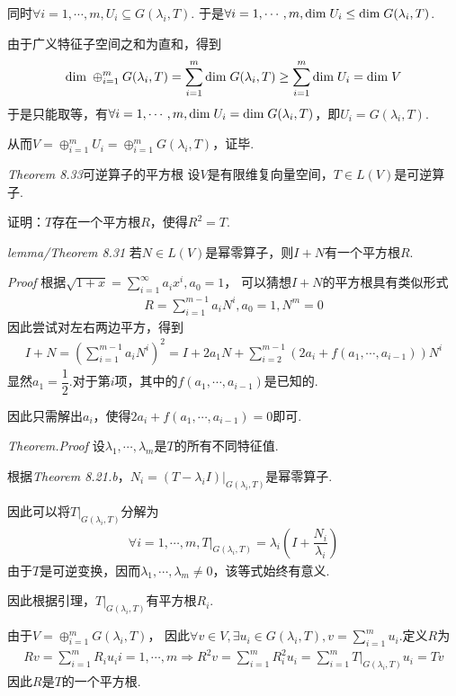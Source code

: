 同时\(\forall i=1,\cdots,m,U_i \subseteq G(\lambda_i,T)\).
于是\(\forall i=1,\cdots,m,\mathrm{dim \;} U_i \leq \mathrm{dim \;} G(\lambda_i,T)\).

由于广义特征子空间之和为直和，得到
    \begin{align*}
        \mathrm{dim \;} \oplus_{i=1}^m G(\lambda_i,T)=\sum_{i=1}^m \mathrm{dim \;} G(\lambda_i,T) \geq \sum_{i=1}^m \mathrm{dim \;} U_i=\mathrm{dim \;} V
    \end{align*}
于是只能取等，有\(\forall i=1,\cdots,m,\mathrm{dim \;} U_i=\mathrm{dim \;} G(\lambda_i,T)\)，即\(U_i=G(\lambda_i,T)\).

从而\(V=\oplus_{i=1}^m U_i=\oplus_{i=1}^m G(\lambda_i,T)\)，证毕.

\newpage

\textit{Theorem 8.33}{\kaishu 可逆算子的平方根}
设\(V\)是有限维复向量空间，\(T \in L(V)\)是可逆算子.

证明：\(T\)存在一个平方根\(R\)，使得\(R^2=T\).

\textit{lemma/Theorem 8.31}
若\(N \in L(V)\)是幂零算子，则\(I+N\)有一个平方根\(R\).

\textit{Proof}
根据\(\sqrt{1+x}=\sum_{i=1}^\infty a_ix^i,a_0=1\)，
可以猜想\(I+N\)的平方根具有类似形式
    \begin{align*}
        R=\sum_{i=1}^{m-1} a_iN^i,a_0=1,N^m=0
    \end{align*}
因此尝试对左右两边平方，得到
    \begin{align*}
        I+N = (\sum_{i=1}^{m-1} a_iN^i)^2 
            = I+2a_1N+\sum_{i=2}^{m-1} (2a_i+f(a_1,\cdots,a_{i-1}))N^i
    \end{align*}
显然\(a_1=\dfrac{1}{2}\).对于第\(i\)项，其中的\(f(a_1,\cdots,a_{i-1})\)是已知的.

因此只需解出\(a_i\)，使得\(2a_i+f(a_1,\cdots,a_{i-1})=0\)即可.

\textit{Theorem.Proof}
设\(\lambda_1,\cdots,\lambda_m\)是\(T\)的所有不同特征值.

根据\textit{Theorem 8.21.b}，\(N_i=(T-\lambda_i I)|_{G(\lambda_i,T)}\)是幂零算子.

因此可以将\(T|_{G(\lambda_i,T)}\)分解为
    \begin{align*}
        \forall i=1,\cdots,m,T|_{G(\lambda_i,T)}=\lambda_i(I+\dfrac{N_i}{\lambda_i})
    \end{align*}
由于\(T\)是可逆变换，因而\(\lambda_1,\cdots,\lambda_m \ne 0\)，该等式始终有意义.

因此根据引理，\(T|_{G(\lambda_i,T)}\)有平方根\(R_i\).

由于\(V=\oplus_{i=1}^m G(\lambda_i,T)\)，
因此\(\forall v \in V,\exists u_i \in G(\lambda_i,T),v=\sum_{i=1}^m u_i\).定义\(R\)为
    \begin{align*}
        Rv=\sum_{i=1}^m R_iu_i i=1,\cdots,m \Rightarrow
        R^2v=\sum_{i=1}^m R_i^2 u_i=\sum_{i=1}^m T|_{G(\lambda_i,T)}u_i=Tv
    \end{align*}
因此\(R\)是\(T\)的一个平方根.

